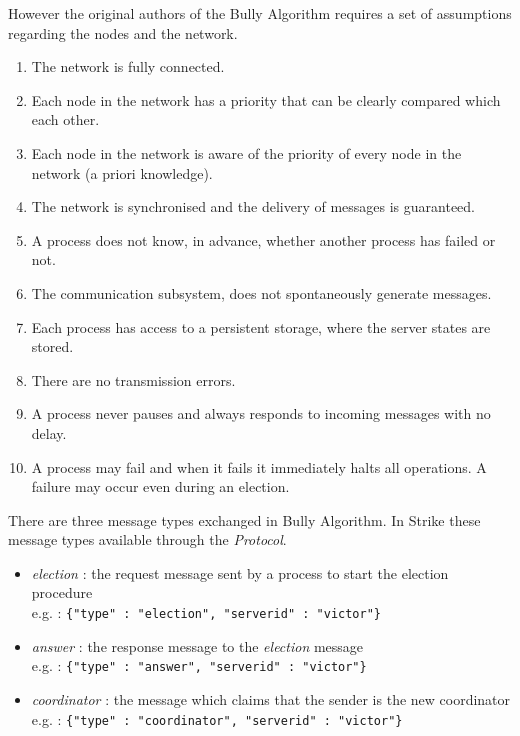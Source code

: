\documentclass[dareport.tex]{subfiles}
\begin{document}
However the original authors of the Bully Algorithm requires a set of assumptions regarding the nodes and the network\cite{election}.
\begin{enumerate}\label{ba-assumptions}
	\item The network is fully connected.\label{assumption:1}
	\item Each node in the network has a priority that can be clearly compared which each other.\label{assumption:2}
	\item Each node in the network is aware of the priority of every node in the network (a priori knowledge).\label{assumption:3}
	\item The network is synchronised and the delivery of messages is guaranteed.\label{assumption:4}
	\item A process does not know, in advance, whether another process has failed or not.\label{assumption:5}
	\item The communication subsystem, does not spontaneously generate messages.\label{assumption:6}
	\item Each process has access to a persistent storage, where the server states are stored.\label{assumption:7}
	\item There are no transmission errors.\label{assumption:8}
	\item A process never pauses and always responds to incoming messages with no delay.\label{assumption:9}
	\item A process may fail and when it fails it immediately halts all operations. A failure may occur even during an election.\label{assumption:10}
\end{enumerate}
There are three message types exchanged in Bully Algorithm. In Strike these message types available through the \emph{Protocol}.
\begin{itemize}\label{ba-message-types}
	\item \emph{election} : the request message sent by a process to start the election procedure\\
	e.g. : \verb|{"type" : "election", "serverid" : "victor"}|
	\item \emph{answer} : the response message to the \emph{election} message\\
	e.g. : \verb|{"type" : "answer", "serverid" : "victor"}|
	\item \emph{coordinator} : the message which claims that the sender is the new coordinator\\
	e.g. : \verb|{"type" : "coordinator", "serverid" : "victor"}|
\end{itemize}
\end{document}
